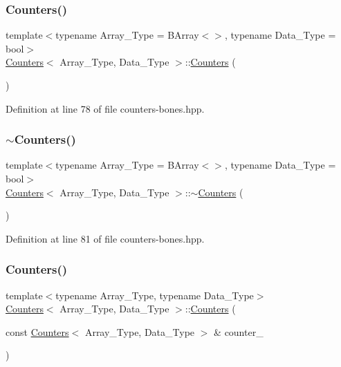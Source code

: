 \subsubsection{\texorpdfstring{Counters()}{Counters()}\hspace{0.1cm}{\footnotesize\ttfamily [1/2]}}
{\footnotesize\ttfamily template$<$typename Array\+\_\+\+Type = B\+Array$<$$>$, typename Data\+\_\+\+Type = bool$>$ \\
\hyperlink{class_counters}{Counters}$<$ Array\+\_\+\+Type, Data\+\_\+\+Type $>$\+::\hyperlink{class_counters}{Counters} (\begin{DoxyParamCaption}{ }\end{DoxyParamCaption})\hspace{0.3cm}{\ttfamily [inline]}}



Definition at line 78 of file counters-\/bones.\+hpp.

\mbox{\label{class_counters_a6ce3fa5d32d646efb5d83fa1feaf5e95}} 
\subsubsection{\texorpdfstring{$\sim$\+Counters()}{~Counters()}}
{\footnotesize\ttfamily template$<$typename Array\+\_\+\+Type = B\+Array$<$$>$, typename Data\+\_\+\+Type = bool$>$ \\
\hyperlink{class_counters}{Counters}$<$ Array\+\_\+\+Type, Data\+\_\+\+Type $>$\+::$\sim$\hyperlink{class_counters}{Counters} (\begin{DoxyParamCaption}{ }\end{DoxyParamCaption})\hspace{0.3cm}{\ttfamily [inline]}}



Definition at line 81 of file counters-\/bones.\+hpp.

\mbox{\label{class_counters_a178c0267c1f52a36e10e9d257a21a224}} 
\subsubsection{\texorpdfstring{Counters()}{Counters()}\hspace{0.1cm}{\footnotesize\ttfamily [2/2]}}
{\footnotesize\ttfamily template$<$typename Array\+\_\+\+Type, typename Data\+\_\+\+Type$>$ \\
\hyperlink{class_counters}{Counters}$<$ Array\+\_\+\+Type, Data\+\_\+\+Type $>$\+::\hyperlink{class_counters}{Counters} (\begin{DoxyParamCaption}\item[{const \hyperlink{class_counters}{Counters}$<$ Array\+\_\+\+Type, Data\+\_\+\+Type $>$ \&}]{counter\+\_\+ }\end{DoxyParamCaption})\hspace{0.3cm}{\ttfamily [inline]}}



